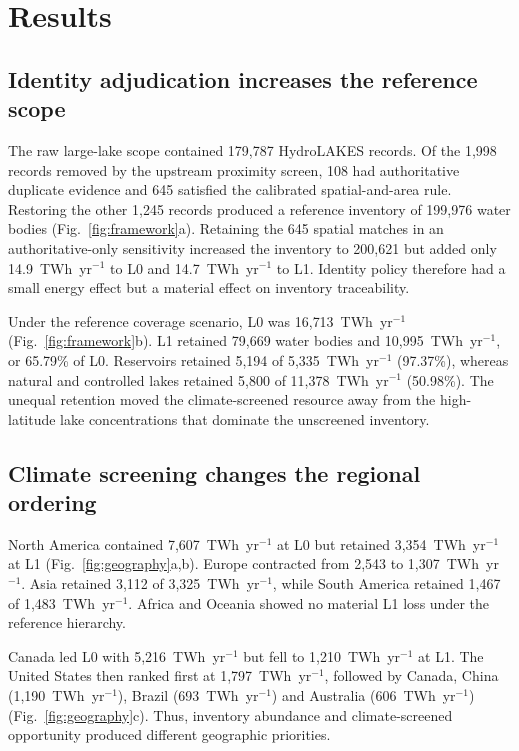 \section{Results}

\subsection{Identity adjudication increases the reference scope}

The raw large-lake scope contained 179{,}787 HydroLAKES records. Of the 1{,}998 records removed by the upstream proximity screen, 108 had authoritative duplicate evidence and 645 satisfied the calibrated spatial-and-area rule. Restoring the other 1{,}245 records produced a reference inventory of 199{,}976 water bodies (Fig.~\ref{fig:framework}a). Retaining the 645 spatial matches in an authoritative-only sensitivity increased the inventory to 200{,}621 but added only 14.9~TWh~yr$^{-1}$ to L0 and 14.7~TWh~yr$^{-1}$ to L1. Identity policy therefore had a small energy effect but a material effect on inventory traceability.

Under the reference coverage scenario, L0 was 16{,}713~TWh~yr$^{-1}$ (Fig.~\ref{fig:framework}b). L1 retained 79{,}669 water bodies and 10{,}995~TWh~yr$^{-1}$, or 65.79\% of L0. Reservoirs retained 5{,}194 of 5{,}335~TWh~yr$^{-1}$ (97.37\%), whereas natural and controlled lakes retained 5{,}800 of 11{,}378~TWh~yr$^{-1}$ (50.98\%). The unequal retention moved the climate-screened resource away from the high-latitude lake concentrations that dominate the unscreened inventory.

\subsection{Climate screening changes the regional ordering}

North America contained 7{,}607~TWh~yr$^{-1}$ at L0 but retained 3{,}354~TWh~yr$^{-1}$ at L1 (Fig.~\ref{fig:geography}a,b). Europe contracted from 2{,}543 to 1{,}307~TWh~yr$^{-1}$. Asia retained 3{,}112 of 3{,}325~TWh~yr$^{-1}$, while South America retained 1{,}467 of 1{,}483~TWh~yr$^{-1}$. Africa and Oceania showed no material L1 loss under the reference hierarchy.

Canada led L0 with 5{,}216~TWh~yr$^{-1}$ but fell to 1{,}210~TWh~yr$^{-1}$ at L1. The United States then ranked first at 1{,}797~TWh~yr$^{-1}$, followed by Canada, China (1{,}190~TWh~yr$^{-1}$), Brazil (693~TWh~yr$^{-1}$) and Australia (606~TWh~yr$^{-1}$) (Fig.~\ref{fig:geography}c). Thus, inventory abundance and climate-screened opportunity produced different geographic priorities.

